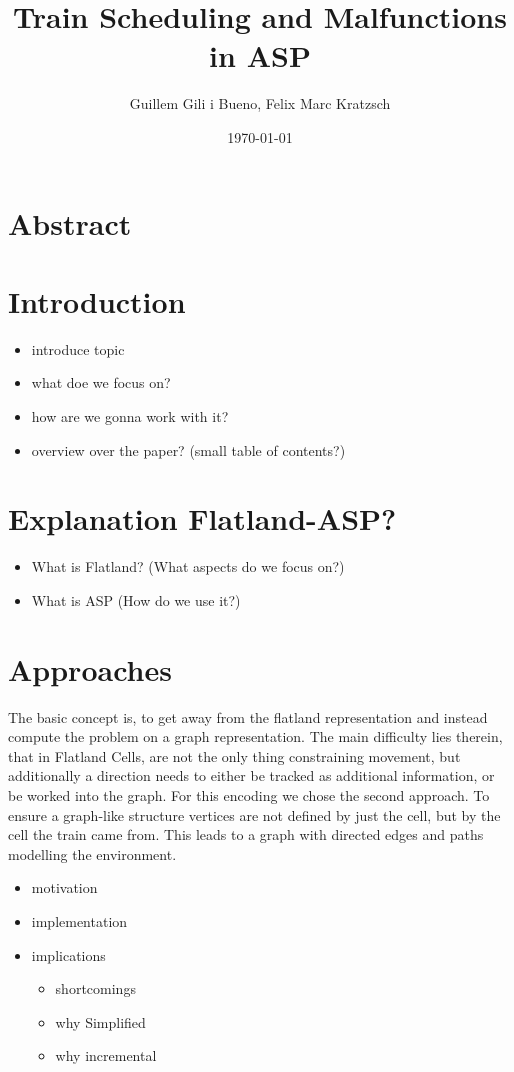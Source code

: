 \documentclass{llncs}
\begin{document}
\title{Train Scheduling and Malfunctions in ASP}
\author{Guillem Gili i Bueno, Felix Marc Kratzsch}
\date{\today}
\maketitle
\begin{multicols*}{2}


\section{Abstract}

\section{Introduction}
\begin{itemize}
    \item introduce topic
    \item what doe we focus on?
    \item how are we gonna work with it?
    \item overview over the paper? (small table of contents?)
\end{itemize}

\section{Explanation Flatland-ASP?}
\begin{itemize}
    \item What is Flatland? (What aspects do we focus on?)
    \item What is ASP (How do we use it?)
\end{itemize}
\section{Approaches}

The basic concept is, to get away from the flatland representation and instead compute the problem on a graph representation. The main difficulty lies therein, that in Flatland Cells, are not the only thing constraining movement, but additionally a direction needs to either be tracked as additional information, or be worked into the graph. For this encoding we chose the second approach. To ensure a graph-like structure vertices are not defined by just the cell, but by the cell the train came from. This leads to a graph with directed edges and paths modelling the environment.
\color{blue}
\begin{itemize}
    \item motivation
    \item implementation
    \item implications
    \begin{itemize}
        \item shortcomings
        \item why Simplified
        \item why incremental
    \end{itemize}
\end{itemize}


\end{multicols*}
\end{document}
